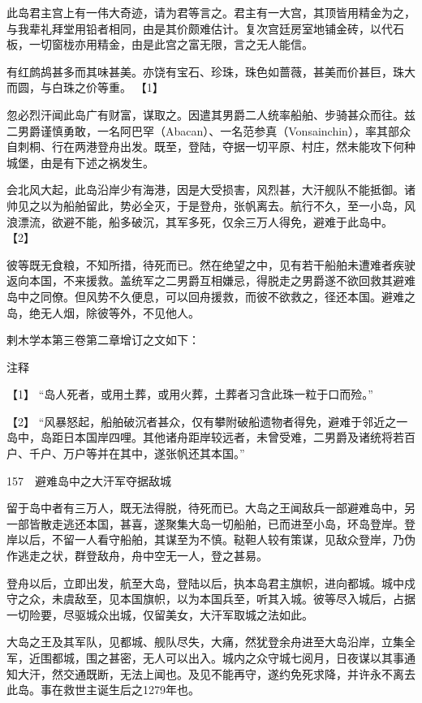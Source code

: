 \documentclass[12pt,UTF8]{ctexbook}
\begin{document}
此岛君主宫上有一伟大奇迹，请为君等言之。君主有一大宫，其顶皆用精金为之，与我辈礼拜堂用铅者相同，由是其价颇难估计。复次宫廷房室地铺金砖，以代石板，一切窗栊亦用精金，由是此宫之富无限，言之无人能信。

有红鹧鸪甚多而其味甚美。亦饶有宝石、珍珠，珠色如蔷薇，甚美而价甚巨，珠大而圆，与白珠之价等重。 【1】

忽必烈汗闻此岛广有财富，谋取之。因遣其男爵二人统率船舶、步骑甚众而往。兹二男爵谨慎勇敢，一名阿巴罕（Abacan）、一名范参真（Vonsainchin），率其部众自刺桐、行在两港登舟出发。既至，登陆，夺据一切平原、村庄，然未能攻下何种城堡，由是有下述之祸发生。

会北风大起，此岛沿岸少有海港，因是大受损害，风烈甚，大汗舰队不能抵御。诸帅见之以为船舶留此，势必全灭，于是登舟，张帆离去。航行不久，至一小岛，风浪漂流，欲避不能，船多破沉，其军多死，仅余三万人得免，避难于此岛中。 【2】

彼等既无食粮，不知所措，待死而已。然在绝望之中，见有若干船舶未遭难者疾驶返向本国，不来援救。盖统军之二男爵互相嫌忌，得脱走之男爵遂不欲回救其避难岛中之同僚。但风势不久便息，可以回舟援救，而彼不欲救之，径还本国。避难之岛，绝无人烟，除彼等外，不见他人。

剌木学本第三卷第二章增订之文如下：

注释

【1】 “岛人死者，或用土葬，或用火葬，土葬者习含此珠一粒于口而殓。”

【2】 “风暴怒起，船舶破沉者甚众，仅有攀附破船遗物者得免，避难于邻近之一岛中，岛距日本国岸四哩。其他诸舟距岸较远者，未曾受难，二男爵及诸统将若百户、千户、万户等并在其中，遂张帆还其本国。”





157　避难岛中之大汗军夺据敌城

留于岛中者有三万人，既无法得脱，待死而已。大岛之王闻敌兵一部避难岛中，另一部皆散走逃还本国，甚喜，遂聚集大岛一切船舶，已而进至小岛，环岛登岸。登岸以后，不留一人看守船舶，其谋至为不慎。鞑靼人较有策谋，见敌众登岸，乃伪作逃走之状，群登敌舟，舟中空无一人，登之甚易。

登舟以后，立即出发，航至大岛，登陆以后，执本岛君主旗帜，进向都城。城中戍守之众，未虞敌至，见本国旗帜，以为本国兵至，听其入城。彼等尽入城后，占据一切险要，尽驱城众出城，仅留美女，大汗军取城之法如此。

大岛之王及其军队，见都城、舰队尽失，大痛，然犹登余舟进至大岛沿岸，立集全军，近围都城，围之甚密，无人可以出入。城内之众守城七阅月，日夜谋以其事通知大汗，然交通既断，无法上闻也。及见不能再守，遂约免死求降，并许永不离去此岛。事在救世主诞生后之1279年也。
\end{document}
